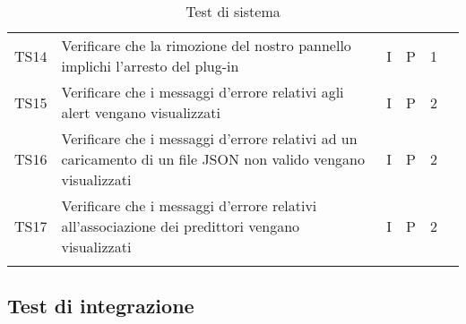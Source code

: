\begin{longtable} {
	>{}p{12mm}
	>{}p{79.5mm}
	>{}p{9mm}
	>{}p{8mm}
	>{}p{14mm}
	>{}p{0mm}}
	TS14 & Verificare che la rimozione del nostro pannello implichi l'arresto del plug-in & I & P & 1 & \TBstrut \\ [2mm]
	TS15 & Verificare che i messaggi d'errore relativi agli alert vengano visualizzati & I & P & 2 & \TBstrut \\ [2mm]
	TS16 & Verificare che i messaggi d'errore relativi ad un caricamento di un file JSON non valido vengano visualizzati & I & P & 2 & \TBstrut \\ [2mm]
	TS17 & Verificare che i messaggi d'errore relativi all'associazione dei predittori vengano visualizzati & I & P & 2 & \TBstrut \\ [2mm]
	\rowcolor{white}
	\caption{Test di sistema}
\end{longtable}


\subsection{Test di integrazione}

